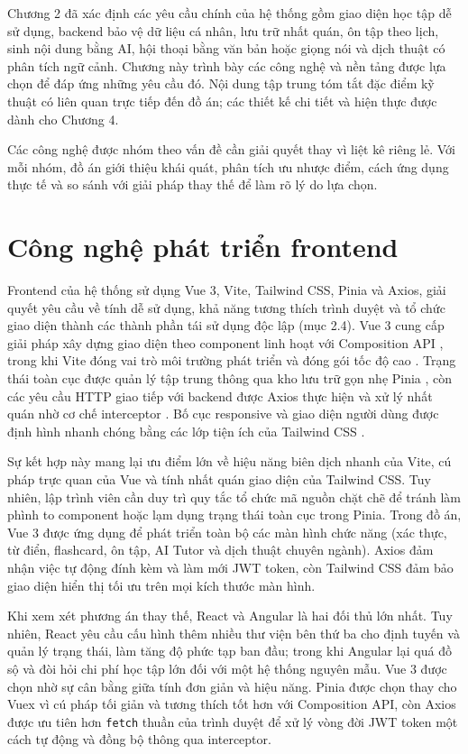 \documentclass[../DoAn.tex]{subfiles}
\begin{document}
Chương 2 đã xác định các yêu cầu chính của hệ thống gồm giao diện học tập dễ sử dụng, backend bảo vệ dữ liệu cá nhân, lưu trữ nhất quán, ôn tập theo lịch, sinh nội dung bằng AI, hội thoại bằng văn bản hoặc giọng nói và dịch thuật có phân tích ngữ cảnh. Chương này trình bày các công nghệ và nền tảng được lựa chọn để đáp ứng những yêu cầu đó. Nội dung tập trung tóm tắt đặc điểm kỹ thuật có liên quan trực tiếp đến đồ án; các thiết kế chi tiết và hiện thực được dành cho Chương 4.

Các công nghệ được nhóm theo vấn đề cần giải quyết thay vì liệt kê riêng lẻ. Với mỗi nhóm, đồ án giới thiệu khái quát, phân tích ưu nhược điểm, cách ứng dụng thực tế và so sánh với giải pháp thay thế để làm rõ lý do lựa chọn.

\section{Công nghệ phát triển frontend}
\label{section:3.1}

Frontend của hệ thống sử dụng Vue 3, Vite, Tailwind CSS, Pinia và Axios, giải quyết yêu cầu về tính dễ sử dụng, khả năng tương thích trình duyệt và tổ chức giao diện thành các thành phần tái sử dụng độc lập (mục 2.4). Vue 3 cung cấp giải pháp xây dựng giao diện theo component linh hoạt với Composition API \cite{vue-docs}, trong khi Vite đóng vai trò môi trường phát triển và đóng gói tốc độ cao \cite{vite-guide}. Trạng thái toàn cục được quản lý tập trung thông qua kho lưu trữ gọn nhẹ Pinia \cite{pinia-docs}, còn các yêu cầu HTTP giao tiếp với backend được Axios thực hiện và xử lý nhất quán nhờ cơ chế interceptor \cite{axios-docs}. Bố cục responsive và giao diện người dùng được định hình nhanh chóng bằng các lớp tiện ích của Tailwind CSS \cite{tailwind-docs}.

Sự kết hợp này mang lại ưu điểm lớn về hiệu năng biên dịch nhanh của Vite, cú pháp trực quan của Vue và tính nhất quán giao diện của Tailwind CSS. Tuy nhiên, lập trình viên cần duy trì quy tắc tổ chức mã nguồn chặt chẽ để tránh làm phình to component hoặc lạm dụng trạng thái toàn cục trong Pinia. Trong đồ án, Vue 3 được ứng dụng để phát triển toàn bộ các màn hình chức năng (xác thực, từ điển, flashcard, ôn tập, AI Tutor và dịch thuật chuyên ngành). Axios đảm nhận việc tự động đính kèm và làm mới JWT token, còn Tailwind CSS đảm bảo giao diện hiển thị tối ưu trên mọi kích thước màn hình.

Khi xem xét phương án thay thế, React và Angular là hai đối thủ lớn nhất. Tuy nhiên, React yêu cầu cấu hình thêm nhiều thư viện bên thứ ba cho định tuyến và quản lý trạng thái, làm tăng độ phức tạp ban đầu; trong khi Angular lại quá đồ sộ và đòi hỏi chi phí học tập lớn đối với một hệ thống nguyên mẫu. Vue 3 được chọn nhờ sự cân bằng giữa tính đơn giản và hiệu năng. Pinia được chọn thay cho Vuex vì cú pháp tối giản và tương thích tốt hơn với Composition API, còn Axios được ưu tiên hơn \texttt{fetch} thuần của trình duyệt để xử lý vòng đời JWT token một cách tự động và đồng bộ thông qua interceptor.
\end{document}
